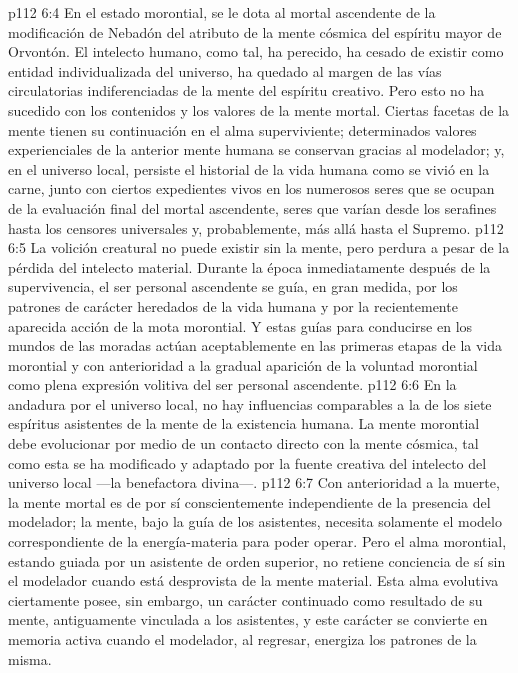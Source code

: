 \vs p112 6:4 \pc En el estado morontial, se le dota al mortal ascendente de la modificación de Nebadón del atributo de la mente cósmica del espíritu mayor de Orvontón. El intelecto humano, como tal, ha perecido, ha cesado de existir como entidad individualizada del universo, ha quedado al margen de las vías circulatorias indiferenciadas de la mente del espíritu creativo. Pero esto no ha sucedido con los contenidos y los valores de la mente mortal. Ciertas facetas de la mente tienen su continuación en el alma superviviente; determinados valores experienciales de la anterior mente humana se conservan gracias al modelador; y, en el universo local, persiste el historial de la vida humana como se vivió en la carne, junto con ciertos expedientes vivos en los numerosos seres que se ocupan de la evaluación final del mortal ascendente, seres que varían desde los serafines hasta los censores universales y, probablemente, más allá hasta el Supremo.
\vs p112 6:5 La volición creatural no puede existir sin la mente, pero perdura a pesar de la pérdida del intelecto material. Durante la época inmediatamente después de la supervivencia, el ser personal ascendente se guía, en gran medida, por los patrones de carácter heredados de la vida humana y por la recientemente aparecida acción de la mota morontial. Y estas guías para conducirse en los mundos de las moradas actúan aceptablemente en las primeras etapas de la vida morontial y con anterioridad a la gradual aparición de la voluntad morontial como plena expresión volitiva del ser personal ascendente.
\vs p112 6:6 En la andadura por el universo local, no hay influencias comparables a la de los siete espíritus asistentes de la mente de la existencia humana. La mente morontial debe evolucionar por medio de un contacto directo con la mente cósmica, tal como esta se ha modificado y adaptado por la fuente creativa del intelecto del universo local ---la benefactora divina---.
\vs p112 6:7 \pc Con anterioridad a la muerte, la mente mortal es de por sí conscientemente independiente de la presencia del modelador; la mente, bajo la guía de los asistentes, necesita solamente el modelo correspondiente de la energía\hyp{}materia para poder operar. Pero el alma morontial, estando guiada por un asistente de orden superior, no retiene conciencia de sí sin el modelador cuando está desprovista de la mente material. Esta alma evolutiva ciertamente posee, sin embargo, un carácter continuado como resultado de su mente, antiguamente vinculada a los asistentes, y este carácter se convierte en memoria activa cuando el modelador, al regresar, energiza los patrones de la misma.
